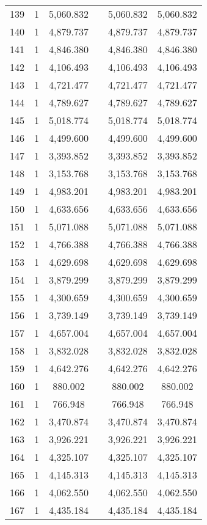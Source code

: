 \begin{table}[!htbp]
\begin{tabular}{@{\extracolsep{5pt}}lccccc}
139 & 1 & 5,060.832 &  & 5,060.832 & 5,060.832 \\ 
140 & 1 & 4,879.737 &  & 4,879.737 & 4,879.737 \\ 
141 & 1 & 4,846.380 &  & 4,846.380 & 4,846.380 \\ 
142 & 1 & 4,106.493 &  & 4,106.493 & 4,106.493 \\ 
143 & 1 & 4,721.477 &  & 4,721.477 & 4,721.477 \\ 
144 & 1 & 4,789.627 &  & 4,789.627 & 4,789.627 \\ 
145 & 1 & 5,018.774 &  & 5,018.774 & 5,018.774 \\ 
146 & 1 & 4,499.600 &  & 4,499.600 & 4,499.600 \\ 
147 & 1 & 3,393.852 &  & 3,393.852 & 3,393.852 \\ 
148 & 1 & 3,153.768 &  & 3,153.768 & 3,153.768 \\ 
149 & 1 & 4,983.201 &  & 4,983.201 & 4,983.201 \\ 
150 & 1 & 4,633.656 &  & 4,633.656 & 4,633.656 \\ 
151 & 1 & 5,071.088 &  & 5,071.088 & 5,071.088 \\ 
152 & 1 & 4,766.388 &  & 4,766.388 & 4,766.388 \\ 
153 & 1 & 4,629.698 &  & 4,629.698 & 4,629.698 \\ 
154 & 1 & 3,879.299 &  & 3,879.299 & 3,879.299 \\ 
155 & 1 & 4,300.659 &  & 4,300.659 & 4,300.659 \\ 
156 & 1 & 3,739.149 &  & 3,739.149 & 3,739.149 \\ 
157 & 1 & 4,657.004 &  & 4,657.004 & 4,657.004 \\ 
158 & 1 & 3,832.028 &  & 3,832.028 & 3,832.028 \\ 
159 & 1 & 4,642.276 &  & 4,642.276 & 4,642.276 \\ 
160 & 1 & 880.002 &  & 880.002 & 880.002 \\ 
161 & 1 & 766.948 &  & 766.948 & 766.948 \\ 
162 & 1 & 3,470.874 &  & 3,470.874 & 3,470.874 \\ 
163 & 1 & 3,926.221 &  & 3,926.221 & 3,926.221 \\ 
164 & 1 & 4,325.107 &  & 4,325.107 & 4,325.107 \\ 
165 & 1 & 4,145.313 &  & 4,145.313 & 4,145.313 \\ 
166 & 1 & 4,062.550 &  & 4,062.550 & 4,062.550 \\ 
167 & 1 & 4,435.184 &  & 4,435.184 & 4,435.184 \\ 

\end{tabular}
\end{table}
